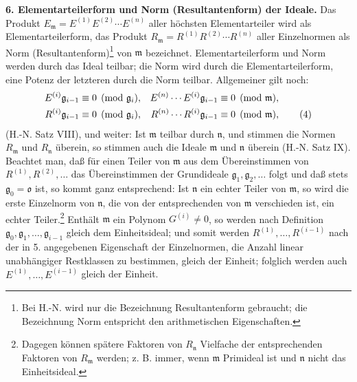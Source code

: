 \documentclass[11pt]{article}
\providecommand{\frakm}{\mathfrak m}
\providecommand{\frakn}{\mathfrak n}
\providecommand{\frakg}{\mathfrak g}
\providecommand{\frako}{\mathfrak o}
\begin{document}
\textbf{6. Elementarteilerform und Norm (Resultantenform) der Ideale.} Das Produkt $E_\frakm=E^{(1)}E^{(2)}\cdots E^{(n)}$ aller höchsten Elementarteiler wird als Elementarteilerform, das Produkt $R_\frakm=R^{(1)}R^{(2)}\cdots R^{(n)}$ aller Einzelnormen als Norm (Resultantenform)\footnote{Bei H.-N. wird nur die Bezeichnung Resultantenform gebraucht; die Bezeichnung Norm entspricht den arithmetischen Eigenschaften.} von $\frakm$ bezeichnet. Elementarteilerform und Norm werden durch das Ideal teilbar; die Norm wird durch die Elementarteilerform, eine Potenz der letzteren durch die Norm teilbar. Allgemeiner gilt noch:
\begin{align}
 E^{(i)}\frakg_{i-1}&\equiv0\pmod{\frakg_i},
& E^{(n)}\cdots E^{(i)}\frakg_{i-1}&\equiv0\pmod{\frakm},\notag\\
 R^{(i)}\frakg_{i-1}&\equiv0\pmod{\frakg_i},
& R^{(n)}\cdots R^{(i)}\frakg_{i-1}&\equiv0\pmod{\frakm}, \tag{4}
\end{align}
(H.-N. Satz VIII), und weiter: Ist $\frakm$ teilbar durch $\frakn$, und stimmen die Normen $R_\frakm$ und $R_\frakn$ überein, so stimmen auch die Ideale $\frakm$ und $\frakn$ überein (H.-N. Satz IX). Beachtet man, daß für einen Teiler von $\frakm$ aus dem Übereinstimmen von $R^{(1)},R^{(2)},\ldots$ das Übereinstimmen der Grundideale $\frakg_1,\frakg_2,\ldots$ folgt und daß stets $\frakg_0=\frako$ ist, so kommt ganz entsprechend: Ist $\frakn$ ein echter Teiler von $\frakm$, so wird die erste Einzelnorm von $\frakn$, die von der entsprechenden von $\frakm$ verschieden ist, ein echter Teiler.\footnote{Dagegen können spätere Faktoren von $R_\frakn$ Vielfache der entsprechenden Faktoren von $R_\frakm$ werden; z. B. immer, wenn $\frakm$ Primideal ist und $\frakn$ nicht das Einheitsideal.} Enthält $\frakm$ ein Polynom $G^{(i)}\ne0$, so werden nach Definition $\frakg_0,\frakg_1,\ldots,\frakg_{i-1}$ gleich dem Einheitsideal; und somit werden $R^{(1)},\ldots,R^{(i-1)}$ nach der in 5. angegebenen Eigenschaft der Einzelnormen, die Anzahl linear unabhängiger Restklassen zu bestimmen, gleich der Einheit; folglich werden auch $E^{(1)},\ldots,E^{(i-1)}$ gleich der Einheit.
\end{document}
